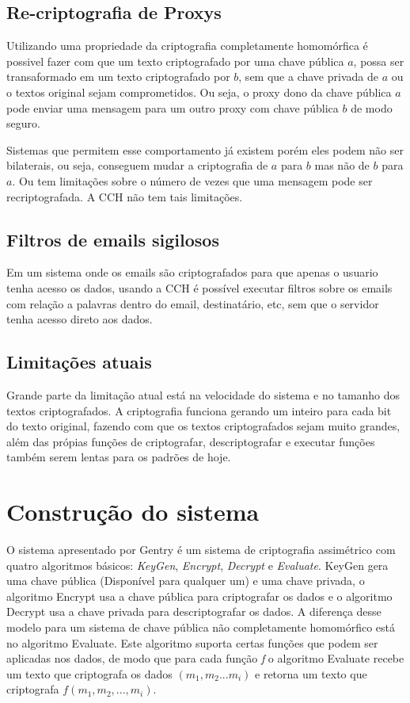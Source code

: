 	\subsection{Re-criptografia de Proxys}
	Utilizando uma propriedade da criptografia completamente homomórfica é possivel fazer com que um texto criptografado por uma chave pública \( a \), possa ser transaformado em um texto criptografado por \( b\), sem que a chave privada de \( a \) ou o textos original sejam comprometidos.
	Ou seja, o proxy dono da chave pública \( a \) pode enviar uma mensagem para um outro proxy com chave pública \( b \) de modo seguro.
	
	Sistemas que permitem esse comportamento já existem porém eles podem não ser bilaterais, ou seja, conseguem mudar a criptografia de \(a\) para \(b\) mas não de \(b\) para \(a\). Ou tem limitações sobre o número de vezes que uma mensagem pode ser recriptografada. A CCH não tem tais limitações.

	\subsection{Filtros de emails sigilosos}
	Em um sistema onde os emails são criptografados para que apenas o usuario tenha acesso os dados, usando a CCH é possível executar filtros sobre os emails com relação a palavras dentro do email, destinatário, etc, sem que o servidor tenha acesso direto aos dados.
	
	\subsection{Limitações atuais}
	Grande parte da limitação atual está na velocidade do sistema e no tamanho dos textos criptografados. A criptografia funciona gerando um inteiro para cada bit do texto original, fazendo com que os textos criptografados sejam muito grandes, além das própias funções de criptografar, descriptografar e executar funções também serem lentas para os padrões de hoje.
	
\newpage

\section{Construção do sistema}\label{sec:LABEL_CHP_1_SEC_C}
O sistema apresentado por Gentry é um sistema de criptografia assimétrico com quatro algoritmos básicos: \textit{KeyGen}, \textit{Encrypt}, \textit{Decrypt} e \textit{Evaluate}. KeyGen gera uma chave pública (Disponível para qualquer um) e uma chave privada, o algoritmo Encrypt usa a chave pública para criptografar os dados e o algoritmo Decrypt usa a chave privada para descriptografar os dados. A diferença desse modelo para um sistema de chave pública não completamente homomórfico está no algoritmo Evaluate. Este algoritmo suporta certas funções que podem ser aplicadas nos dados, de modo que para cada função \textit{f} o algoritmo Evaluate recebe um texto que criptografa os dados \((m_1,m_2...m_i)\) e retorna um texto que criptografa \( f(m_1,m_2,...,m_i) \).

